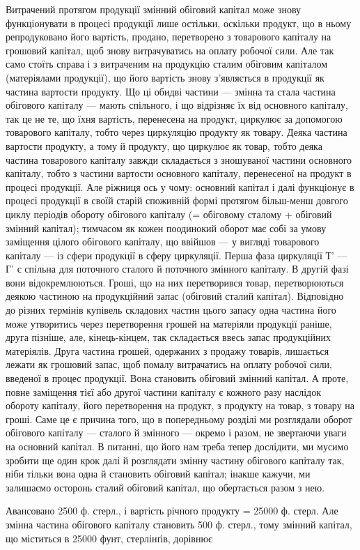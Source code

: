 Витрачений протягом продукції змінний обіговий капітал може знову
функціонувати в процесі продукції лише остільки, оскільки продукт, що
в ньому репродуковано його вартість, продано, перетворено з товарового
капіталу на грошовий капітал, щоб знову витрачуватись на оплату робочої
сили. Але так само стоїть справа і з витраченим на продукцію сталим
обіговим капіталом (матеріялами продукції), що його вартість знову з’являється
в продукції як частина вартости продукту. Що ці обидві частини —
змінна та стала частина обігового капіталу — мають спільного, і що відрізняє
їх від основного капіталу, так це не те, що їхня вартість, перенесена
на продукт, циркулює за допомогою товарового капіталу, тобто
через циркуляцію продукту як товару. Деяка частина вартости продукту,
а тому й продукту, що циркулює як товар, тобто деяка частина товарового
капіталу завжди складається з зношуваної частини основного капіталу,
тобто з частини вартости основного капіталу, перенесеної на продукт
в процесі продукції. Але ріжниця ось у чому: основний капітал і
далі функціонує в процесі продукції в своїй старій споживній формі протягом
більш-менш довгого циклу періодів обороту обігового капіталу
(= обіговому сталому + обіговий змінний капітал); тимчасом як кожен
поодинокий оборот має собі за умову заміщення цілого обігового капіталу,
що ввійшов — у вигляді товарового капіталу — із сфери продукції в
сферу циркуляції. Перша фаза циркуляції Т' — Г' є спільна для поточного
сталого й поточного змінного капіталу. В другій фазі вони відокремлюються.
Гроші, що на них перетворився товар, перетворюються деякою
частиною на продукційний запас (обіговий сталий капітал). Відповідно до
різних термінів купівель складових частин цього запасу одна частина
його може утворитись через перетворення грошей на матеріяли продукції
раніше, друга пізніше, але, кінець-кінцем, так складається ввесь запас продукційних
матеріялів. Друга частина грошей, одержаних з продажу товарів,
лишається лежати як грошовий запас, щоб помалу витрачатись на
оплату робочої сили, введеної в процес продукції. Вона становить обіговий
змінний капітал. А проте, повне заміщення тієї або другої частини капіталу
є кожного разу наслідок обороту капіталу, його перетворення на продукт,
з продукту на товар, з товару на гроші. Саме це є причина того,
що в попередньому розділі ми розглядали оборот обігового капіталу — сталого
й змінного — окремо і разом, не звертаючи уваги на основний капітал.
В питанні, що його нам треба тепер дослідити, ми мусимо зробити ще
один крок далі й розглядати змінну частину обігового капіталу так, ніби
тільки вона одна й становить обіговий капітал; інакше кажучи, ми залишаємо
осторонь сталий обіговий капітал, що обертається разом з нею.

Авансовано 2500 ф. стерл., і вартість річного продукту = 25000 ф.
стерл. Але змінна частина обігового капіталу становить 500 ф. стерл.,
тому змінний капітал, що міститься в 25000 фунт, стерлінґів, дорівнює
\parbreak{}  %
